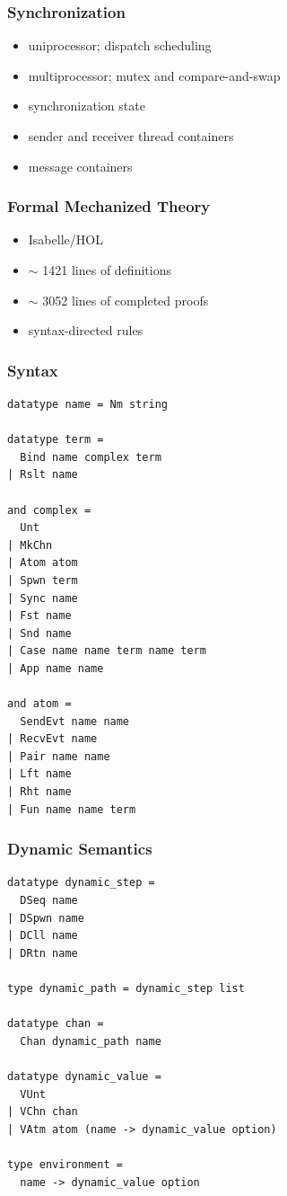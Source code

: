 \documentclass{beamer}
\begin{document}
\begin{frame}
\frametitle{Synchronization}
\begin{itemize}
\item uniprocessor; dispatch scheduling
\item multiprocessor; mutex and compare-and-swap
\item synchronization state
\item sender and receiver thread containers
\item message containers
\end{itemize}
\end{frame}

\begin{frame}[fragile]
	\frametitle{Formal Mechanized Theory}
\begin{itemize}
\item Isabelle/HOL  
\item $\sim$ 1421 lines of definitions  
\item $\sim$ 3052 lines of completed proofs 
\item syntax-directed rules 
\end{itemize}
\end{frame}



\begin{frame}[fragile]
	\frametitle{Syntax}
\begin{lstlisting}[language=logic, mathescape]
datatype name = Nm string

datatype term = 
  Bind name complex term 
| Rslt name

and complex = 
  Unt
| MkChn
| Atom atom
| Spwn term 
| Sync name
| Fst name
| Snd name
| Case name name term name term 
| App name name

and atom = 
  SendEvt name name
| RecvEvt name
| Pair name name
| Lft name
| Rht name
| Fun name name term 
\end{lstlisting}
\end{frame}

\begin{frame}[fragile]
\frametitle{Dynamic Semantics}
\begin{lstlisting}[language=logic, mathescape]
datatype dynamic_step =
  DSeq name
| DSpwn name
| DCll name
| DRtn name 

type dynamic_path = dynamic_step list

datatype chan =
  Chan dynamic_path name 

datatype dynamic_value = 
  VUnt
| VChn chan
| VAtm atom (name -> dynamic_value option)

type environment =
  name -> dynamic_value option
\end{lstlisting}
\end{frame}
\end{document}
